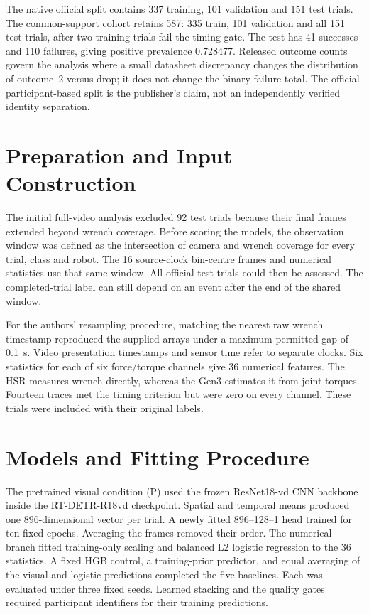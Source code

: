 The native official split contains 337 training, 101 validation and 151 test trials. The common-support cohort retains 587: 335 train, 101 validation and all 151 test trials, after two training trials fail the timing gate. The test has 41 successes and 110 failures, giving positive prevalence 0.728477. Released outcome counts govern the analysis where a small datasheet discrepancy changes the distribution of outcome~2 versus drop; it does not change the binary failure total. The official participant-based split is the publisher's claim, not an independently verified identity separation.

\section{Preparation and Input Construction}
The initial full-video analysis excluded 92 test trials because their final frames extended beyond wrench coverage. Before scoring the models, the observation window was defined as the intersection of camera and wrench coverage for every trial, class and robot. The 16 source-clock bin-centre frames and numerical statistics use that same window. All official test trials could then be assessed. The completed-trial label can still depend on an event after the end of the shared window.

For the authors' resampling procedure, matching the nearest raw wrench timestamp reproduced the supplied arrays under a maximum permitted gap of 0.1~s. Video presentation timestamps and sensor time refer to separate clocks. Six statistics for each of six force/torque channels give 36 numerical features. The HSR measures wrench directly, whereas the Gen3 estimates it from joint torques. Fourteen traces met the timing criterion but were zero on every channel. These trials were included with their original labels.

\section{Models and Fitting Procedure}
The pretrained visual condition (P) used the frozen ResNet18-vd CNN backbone inside the RT-DETR-R18vd checkpoint. Spatial and temporal means produced one 896-dimensional vector per trial. A newly fitted 896--128--1 head trained for ten fixed epochs. Averaging the frames removed their order. The numerical branch fitted training-only scaling and balanced L2 logistic regression to the 36 statistics. A fixed HGB control, a training-prior predictor, and equal averaging of the visual and logistic predictions completed the five baselines. Each was evaluated under three fixed seeds. Learned stacking and the quality gates required participant identifiers for their training predictions.

